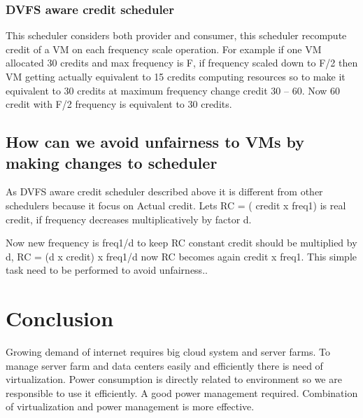 \documentclass[seminar,twoside]{iitbreport}
\begin{document}
\subsubsection{ DVFS aware credit scheduler}
This scheduler considers both provider and consumer, this scheduler recompute credit of a VM on each frequency scale operation.
For example if one VM allocated 30 credits and max frequency is F, if frequency scaled down to F/2 then VM getting actually equivalent to 15 credits computing
resources so to make it equivalent to 30 credits at maximum frequency change credit 30 – 60. Now 60 credit with F/2 frequency is 
equivalent to 30 credits\cite{dvfs}.
\subsection{How can we avoid unfairness to VMs by making changes to scheduler}
As DVFS aware credit scheduler described above it is different from other schedulers because it focus on Actual credit.
Lets RC = ( credit x freq1) is real credit, if frequency decreases multiplicatively by factor d.

Now new frequency is freq1/d to keep RC constant credit should be multiplied by d, RC = (d x credit) x freq1/d 
now RC becomes again credit x freq1. This simple task need to be performed to avoid unfairness.\cite{dvfs}.
\section{Conclusion}
Growing demand of internet requires big cloud system and server farms.
To manage server farm and data centers easily and efficiently there is need of virtualization.
Power consumption is directly related to environment so we are responsible to use it efficiently. A good power management required.
Combination of virtualization and power management is more effective.



\end{document}
